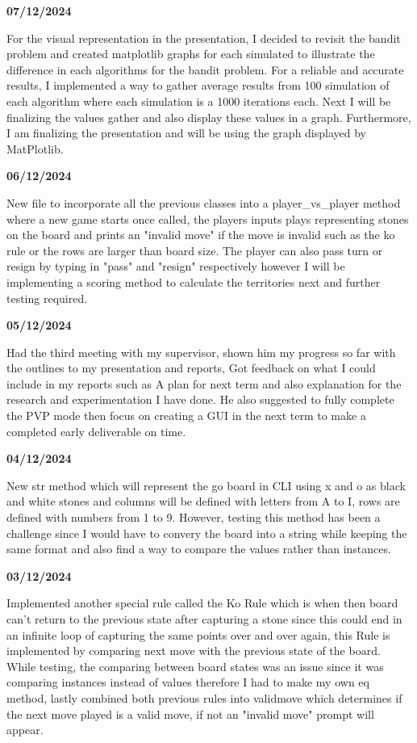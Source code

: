 \documentclass[]{final_report}
\begin{document}
\textbf{07/12/2024}

For the visual representation in the presentation, I decided to revisit the bandit problem and created matplotlib graphs for each simulated to illustrate the difference in each algorithms for the bandit problem. For a reliable and accurate results, I implemented a way to gather average results from 100 simulation of each algorithm where each simulation is a 1000 iterations each. Next I will be finalizing the values gather and also display these values in a graph. Furthermore, I am finalizing the presentation and will be using the graph displayed by MatPlotlib.
\newline
\newline
  
\textbf{06/12/2024}

New file to incorporate all the previous classes into a player\_vs\_player method where a new game starts once called, the players inputs plays representing stones on the board and prints an "invalid move" if the move is invalid such as the ko rule or the rows are larger than board size. The player can also pass turn or resign by typing in "pass" and "resign" respectively however I will be implementing a scoring method to calculate the territories next and further testing required. 
  
\textbf{05/12/2024}

Had the third meeting with my supervisor, shown him my progress so far with the outlines to my presentation and reports, Got feedback on what I could include in my reports such as A plan for next term and also explanation for the research and experimentation I have done. He also suggested to fully complete the PVP mode then focus on creating a GUI in the next term to make a completed early deliverable on time. 
  
\textbf{04/12/2024}

New str method which will represent the go board in CLI using x and o as black and white stones and columns will be defined with letters from A to I, rows are defined with numbers from 1 to 9. However, testing this method has been a challenge since I would have to convery the board into a string while keeping the same format and also find a way to compare the values rather than instances. 
  
\textbf{03/12/2024}

Implemented another special rule called the Ko Rule which is when then board can't return to the previous state after capturing a stone since this could end in an infinite loop of capturing the same points over and over again, this Rule is implemented by comparing next move with the previous state of the board. While testing, the comparing between board states was an issue since it was comparing instances instead of values therefore I had to make my own eq method, lastly combined both previous rules into validmove which determines if the next move played is a valid move, if not an "invalid move" prompt will appear. 
  
\end{document}
